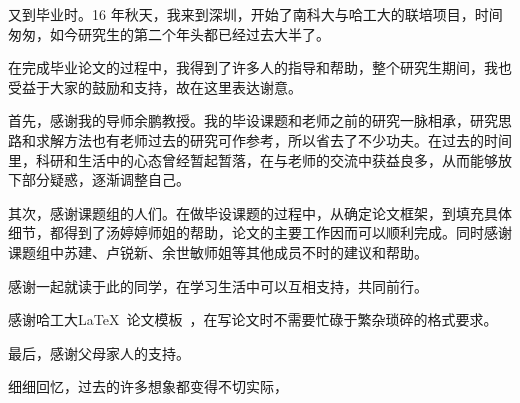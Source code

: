 \begin{acknowledgements}

又到毕业时。16 年秋天，我来到深圳，开始了南科大与哈工大的联培项目，时间匆匆，如今研究生的第二个年头都已经过去大半了。%

在完成毕业论文的过程中，我得到了许多人的指导和帮助，整个研究生期间，我也受益于大家的鼓励和支持，故在这里表达谢意。

首先，感谢我的导师余鹏教授。我的毕设课题和老师之前的研究一脉相承，研究思路和求解方法也有老师过去的研究可作参考，所以省去了不少功夫。在过去的时间里，科研和生活中的心态曾经暂起暂落，在与老师的交流中获益良多，从而能够放下部分疑惑，逐渐调整自己。

其次，感谢课题组的人们。在做毕设课题的过程中，从确定论文框架，到填充具体细节，都得到了汤婷婷师姐的帮助，论文的主要工作因而可以顺利完成。同时感谢课题组中苏建、卢锐新、余世敏师姐等其他成员不时的建议和帮助。

感谢一起就读于此的同学，在学习生活中可以互相支持，共同前行。

感谢哈工大\LaTeX\ 论文模板\hithesis\ ，在写论文时不需要忙碌于繁杂琐碎的格式要求。

最后，感谢父母家人的支持。

细细回忆，过去的许多想象都变得不切实际，%


\end{acknowledgements}
